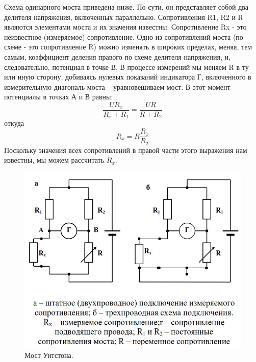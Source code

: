 \documentclass[a4paper,12pt]{article}
\begin{document}
Схема одинарного моста приведена ниже. По сути, он представляет собой два делителя напряжения, включенных параллельно. Сопротивления R1, R2 и R являются элементами моста и их значения известны. Сопротивление Rx - это неизвестное (измеряемое) сопротивление. Одно из сопротивлений моста (по схеме - это сопротивление R) можно изменять в широких пределах, меняя, тем самым, коэффициент деления правого по схеме делителя напряжения, и, следовательно, потенциал в точке В. В процессе измерений мы меняем R в ту или иную сторону, добиваясь нулевых показаний индикатора Г, включенного
в измерительную диагональ моста – уравновешиваем мост. В этот момент потенциалы в точках А и В равны:
\begin{equation}
    \frac{UR_x}{R_x+R_1} = \frac{UR}{R+R_2}
\end{equation}
откуда
\begin{equation}
    R_x = R \frac{R_1}{R_2}
\end{equation}
Поскольку значения всех сопротивлений в правой части этого выражения нам известны, мы можем рассчитать $R_x$.


\begin{figure}[h!]
	\begin{center}
		\includegraphics[scale=0.8]{scheme_1.png}
	\end{center}
	\caption{Мост Уитстона.}
\end{figure}
\clearpage
\end{document}
